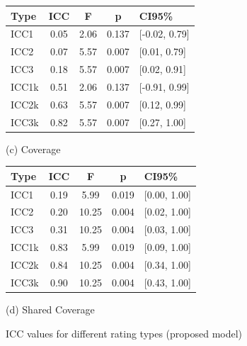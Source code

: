 \begin{figure}[h]
    \vspace{1em}

    \begin{minipage}{.5\textwidth}
        \centering
        \begin{tabular}{lcccl}
            \hline
            \textbf{Type} & \textbf{ICC} & \textbf{F} & \textbf{p} & \textbf{CI95\%} \\
            \hline
            ICC1          & 0.05         & 2.06       & 0.137      & [-0.02, 0.79]   \\
            ICC2          & 0.07         & 5.57       & 0.007      & [0.01, 0.79]    \\
            ICC3          & 0.18         & 5.57       & 0.007      & [0.02, 0.91]    \\
            ICC1k         & 0.51         & 2.06       & 0.137      & [-0.91, 0.99]   \\
            ICC2k         & 0.63         & 5.57       & 0.007      & [0.12, 0.99]    \\
            ICC3k         & 0.82         & 5.57       & 0.007      & [0.27, 1.00]    \\
            \hline
        \end{tabular}
        \caption*{(c) Coverage}
    \end{minipage}%
    \begin{minipage}{.5\textwidth}
        \centering
        \begin{tabular}{lcccl}
            \hline
            \textbf{Type} & \textbf{ICC} & \textbf{F} & \textbf{p} & \textbf{CI95\%} \\
            \hline
            ICC1          & 0.19         & 5.99       & 0.019      & [0.00, 1.00]    \\
            ICC2          & 0.20         & 10.25      & 0.004      & [0.02, 1.00]    \\
            ICC3          & 0.31         & 10.25      & 0.004      & [0.03, 1.00]    \\
            ICC1k         & 0.83         & 5.99       & 0.019      & [0.09, 1.00]    \\
            ICC2k         & 0.84         & 10.25      & 0.004      & [0.34, 1.00]    \\
            ICC3k         & 0.90         & 10.25      & 0.004      & [0.43, 1.00]    \\
            \hline
        \end{tabular}
        \caption*{(d) Shared Coverage}
    \end{minipage}
    \caption{ICC values for different rating types (proposed model)}
    \label{fig:icc_model}
\end{figure}

